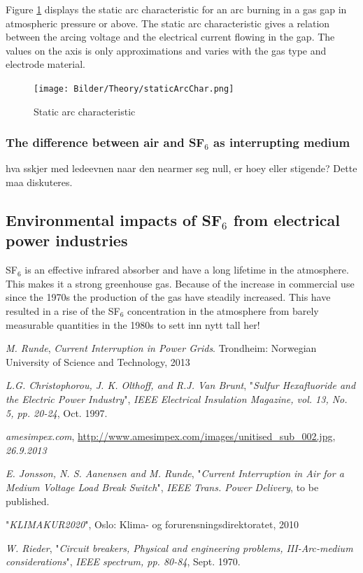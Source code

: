 \documentclass[10pt,a4paper]{article} %
\begin{document}
Figure \ref{fig:staticArcChar} displays the static arc characteristic for an arc burning in a gas gap in atmospheric pressure or above. The static arc characteristic gives a relation between the arcing voltage and the electrical current flowing in the gap. The values on the axis is only approximations and varies with the gas type and electrode material.

\begin{figure} [h]
\centering
\texttt{[image: Bilder/Theory/staticArcChar.png]}
\caption{Static arc characteristic  \cite{bib:HVEbreak}} \label{fig:staticArcChar}
\end{figure}

\subsubsection{The difference between air and SF$_6$ as interrupting medium} \label{seq:airandsf}
hva sskjer med ledeevnen naar den nearmer seg null, er hoey eller stigende? Dette maa diskuteres.
\newpage
\subsection{Environmental impacts of SF$_6$ from electrical power industries}
SF$_6$ is an effective infrared absorber and have a long lifetime in the atmosphere. This makes it a strong greenhouse gas. Because of the increase in commercial use since the 1970s the production of the gas have steadily increased. This have resulted in a rise of the SF$_6$ concentration in the atmosphere from barely measurable quantities in the 1980s \cite{bib:SF6PI} to sett inn nytt tall her!
\newpage

\begin{thebibliography}{10}


 \textit{M. Runde}, \textit{Current Interruption in Power Grids}. Trondheim: Norwegian University of Science and Technology, 2013

 \textit{L.G. Christophorou, J. K. Olthoff, and R.J. Van Brunt}, "\textit{Sulfur Hexafluoride and the Electric Power Industry}", \textit{IEEE Electrical Insulation Magazine, vol. 13, No. 5, pp. 20-24}, Oct. 1997.

 \textit{amesimpex.com}, \url{http://www.amesimpex.com/images/unitised_sub_002.jpg}, \textit{26.9.2013}

 \textit{E. Jonsson, N. S. Aanensen and M. Runde}, "\textit{Current Interruption in Air for a Medium Voltage Load Break Switch}", \textit{IEEE Trans. Power Delivery}, to be published.

 "\textit{KLIMAKUR2020}", Oslo: Klima- og forurensningsdirektoratet, 2010

 \textit{W. Rieder}, "\textit{Circuit breakers, Physical and engineering problems, III-Arc-medium considerations}", \textit{IEEE spectrum, pp. 80-84}, Sept. 1970.
\end{thebibliography}
\end{document}
